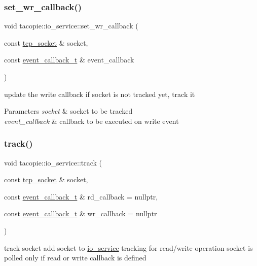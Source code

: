 \subsubsection{\texorpdfstring{set\+\_\+wr\+\_\+callback()}{set\_wr\_callback()}}
{\footnotesize\ttfamily void tacopie\+::io\+\_\+service\+::set\+\_\+wr\+\_\+callback (\begin{DoxyParamCaption}\item[{const \hyperlink{classtacopie_1_1tcp__socket}{tcp\+\_\+socket} \&}]{socket,  }\item[{const \hyperlink{classtacopie_1_1io__service_abb66850c32d9c724f4418d77bd04bcfd}{event\+\_\+callback\+\_\+t} \&}]{event\+\_\+callback }\end{DoxyParamCaption})}

update the write callback if socket is not tracked yet, track it


\begin{DoxyParams}{Parameters}
{\em socket} & socket to be tracked \\
\hline
{\em event\+\_\+callback} & callback to be executed on write event \\
\hline
\end{DoxyParams}
\mbox{\label{classtacopie_1_1io__service_a9f4c8bce3c0f6d660515b0b5eb109df8}} 
\subsubsection{\texorpdfstring{track()}{track()}}
{\footnotesize\ttfamily void tacopie\+::io\+\_\+service\+::track (\begin{DoxyParamCaption}\item[{const \hyperlink{classtacopie_1_1tcp__socket}{tcp\+\_\+socket} \&}]{socket,  }\item[{const \hyperlink{classtacopie_1_1io__service_abb66850c32d9c724f4418d77bd04bcfd}{event\+\_\+callback\+\_\+t} \&}]{rd\+\_\+callback = {\ttfamily nullptr},  }\item[{const \hyperlink{classtacopie_1_1io__service_abb66850c32d9c724f4418d77bd04bcfd}{event\+\_\+callback\+\_\+t} \&}]{wr\+\_\+callback = {\ttfamily nullptr} }\end{DoxyParamCaption})}

track socket add socket to \hyperlink{classtacopie_1_1io__service}{io\+\_\+service} tracking for read/write operation socket is polled only if read or write callback is defined


